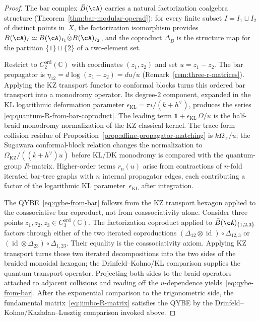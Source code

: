 \begin{proof}
The bar complex $\bar B(\cA)$ carries a natural factorization
coalgebra structure (Theorem~\ref{thm:bar-modular-operad}): for
every finite subset $I = I_1 \sqcup I_2$ of distinct points in~$X$,
the factorization isomorphism provides
$\bar B(\cA)_I \simeq
\bar B(\cA)_{I_1} \hat\otimes \bar B(\cA)_{I_2}$,
and the coproduct $\Delta_{\bar B}$ is the structure map for the
partition $\{1\} \sqcup \{2\}$ of a two-element set.

Restrict to $C_2^{\mathrm{ord}}(\mathbb{C})$ with coordinates
$(z_1, z_2)$ and set $u = z_1 - z_2$. The bar propagator is
$\eta_{12} = d\log(z_1 - z_2) = du/u$
(Remark~\ref{rem:three-r-matrices}). Applying the KZ transport
functor to conformal blocks turns this ordered bar transport into a
monodromy operator. Its degree-$2$ component, expanded in the KL
logarithmic deformation parameter
$\epsilon_{\mathrm{KL}} = \pi i/(k+h^\vee)$, produces the series
\eqref{eq:quantum-R-from-bar-coproduct}. The leading term
$\mathbb{1} + \epsilon_{\mathrm{KL}}\, \Omega/u$ is the half-braid
monodromy normalization of the KZ classical
kernel. The trace-form collision residue of
Proposition~\ref{prop:affine-propagator-matching} is
$k\Omega_{\mathrm{tr}}/u$; the Sugawara conformal-block relation changes the
normalization to
$\Omega_{\mathrm{KZ}}/((k+h^\vee)u)$ before KL/DK monodromy is compared
with the quantum-group $R$-matrix. Higher-order terms
$r_n(u)$ arise from contractions of $n$-fold iterated bar-tree graphs
with $n$ internal propagator edges, each contributing a factor of
the logarithmic KL parameter~$\epsilon_{\mathrm{KL}}$ after integration.

The QYBE~\eqref{eq:qybe-from-bar} follows from the KZ transport
hexagon applied to the coassociative bar coproduct, not from
coassociativity alone.
Consider three points $z_1, z_2, z_3 \in C_3^{\mathrm{ord}}(\mathbb{C})$.
The factorization coproduct applied to
$\bar B(\cA)_{\{1,2,3\}}$ factors through either of the two
iterated coproductions
$(\Delta_{12} \otimes \operatorname{id}) \circ \Delta_{12,3}$ or
$(\operatorname{id} \otimes \Delta_{23}) \circ \Delta_{1,23}$.
Their equality is the coassociativity axiom. Applying KZ transport
turns those two iterated decompositions into the two sides of the
braided monoidal hexagon; the Drinfeld--Kohno/KL comparison supplies
the quantum transport operator. Projecting both sides to the braid
operators attached to adjacent collisions and reading off the
$u$-dependence yields~\eqref{eq:qybe-from-bar}. After
the exponential comparison to the trigonometric side, the fundamental
matrix~\eqref{eq:jimbo-R-matrix} satisfies the QYBE by the
Drinfeld--Kohno/Kazhdan--Lusztig comparison invoked above.
\end{proof}

